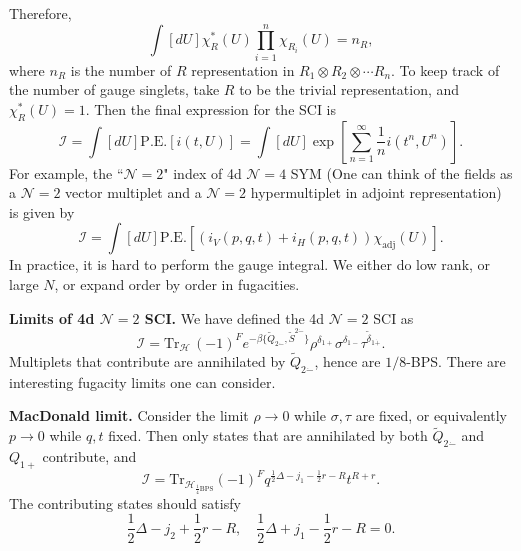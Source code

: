 \documentclass[a4paper,11pt]{article}
\begin{document}
\begin{itemize}
\begin{equation}
    \end{equation}
    Therefore,
    \begin{equation}
        \int[dU] \chi_R^*(U) \prod_{i=1}^n \chi_{R_i}(U) = n_R,
    \end{equation}
    where $n_R$ is the number of $R$ representation in $R_1 \otimes R_2 \otimes \cdots R_n$. To keep track of the number of gauge singlets, take $R$ to be the trivial representation, and $\chi_R^*(U) = 1$. Then the final expression for the SCI is
    \begin{equation}
        \mathcal{I} = \int[dU] \mathrm{P.E.}\left[i(t,U)\right] = \int[dU] \exp\left[\sum_{n=1}^\infty \frac{1}{n} i(t^n, U^n)\right].
    \end{equation}
    For example, the ``$\mathcal{N}=2$" index of 4d $\mathcal{N}=4$ SYM (One can think of the fields as a $\mathcal{N}=2$ vector multiplet and a $\mathcal{N}=2$ hypermultiplet in adjoint representation) is given by
    \begin{equation}
        \mathcal{I} = \int[dU] \mathrm{P.E.}\left[(i_V(p,q,t) + i_H(p,q,t))\chi_\mathrm{adj}(U)\right].
    \end{equation}
    In practice, it is hard to perform the gauge integral. We either do low rank, or large $N$, or expand order by order in fugacities.
\end{itemize}

\bigskip
\noindent\textbf{Limits of 4d $\mathcal{N}=2$ SCI.}
We have defined the 4d $\mathcal{N}=2$ SCI as
\begin{equation}
    \mathcal{I} = \mathrm{Tr}_\mathcal{H}\,(-1)^F e^{-\beta \{\widetilde{Q}_{2\dot{-}}, \widetilde{S}^{2\dot{-}} \}} \rho^{\delta_{1+}} \sigma^{\delta_{1-}} \tau^{\tilde{\delta}_{1\dot{+}}}.
\end{equation}
Multiplets that contribute are annihilated by $\widetilde{Q}_{2\dot{-}}$, hence are $1/8$-BPS.
There are interesting fugacity limits one can consider.

\bigskip
\noindent\textbf{MacDonald limit.}
Consider the limit $\rho \to 0$ while $\sigma, \tau$ are fixed, or equivalently $p \to 0$ while $q, t$ fixed. Then only states that are annihilated by both $\widetilde{Q}_{2\dot{-}}$ and $Q_{1+}$ contribute, and 
\begin{equation}
    \mathcal{I} = \mathrm{Tr}_{\mathcal{H}_{\frac{1}{4}\mathrm{BPS}}} (-1)^F q^{\frac{1}{2}\Delta - j_1 - \frac{1}{2}r -R} t^{R+r}.
\end{equation}
The contributing states should satisfy
\begin{equation}
    \frac{1}{2}\Delta - j_2 +\frac{1}{2}r - R, \quad \frac{1}{2} \Delta + j_1 - \frac{1}{2}r- R = 0.
\end{equation}
\end{document}
